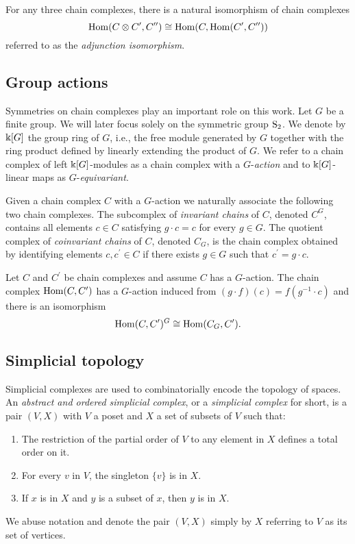 For any three chain complexes, there is a natural isomorphism of chain complexes
\begin{equation*}
\Hom(C \otimes C^\prime, C^{\prime\prime}) \cong
\Hom(C, \Hom(C^\prime, C^{\prime\prime}))
\end{equation*}
referred to as the \textit{adjunction isomorphism}.


\subsection{Group actions}

Symmetries on chain complexes play an important role on this work.
Let $G$ be a finite group.
We will later focus solely on the symmetric group $\S_2$.
We denote by $\k[G]$ the group ring of $G$, i.e., the free module generated by $G$ together with the ring product defined by linearly extending the product of $G$.
We refer to a chain complex of left $\k[G]$-modules as a chain complex with a $G$-\textit{action} and to $\k[G]$-linear maps as $G$-\textit{equivariant}.

Given a chain complex $C$ with a $G$-action we naturally associate the following two chain complexes.
The subcomplex of \textit{invariant chains} of $C$, denoted $C^G$, contains all elements $c \in C$ satisfying $g \cdot c = c$ for every $g \in G$.
The quotient complex of \textit{coinvariant chains} of $C$, denoted $C_G$, is the chain complex obtained by identifying elements $c, c^\prime \in C$ if there exists $g \in G$ such that $c^\prime = g \cdot c$.

Let $C$ and $C^\prime$ be chain complexes and assume $C$ has a $G$-action.
The chain complex $\Hom(C, C^\prime)$ has a $G$-action induced from $(g \cdot f)(c) = f(g^{-1} \cdot c)$ and there is an isomorphism
\begin{equation*}
\Hom(C, C^\prime)^G \cong \Hom(C_G, C^\prime).
\end{equation*}


\subsection{Simplicial topology}

Simplicial complexes are used to combinatorially encode the topology of spaces.
An \textit{abstract and ordered simplicial complex}, or a \textit{simplicial complex} for short, is a pair $(V, X)$ with $V$ a poset and $X$ a set of subsets of $V$ such that: 
\begin{enumerate}
	\item The restriction of the partial order of $V$ to any element in $X$ defines a total order on it.
	\item For every $v$ in $V$, the singleton $\{v\}$ is in $X$.
	\item If $x$ is in $X$ and $y$ is a subset of $x$, then $y$ is in $X$.
\end{enumerate}
We abuse notation and denote the pair $(V, X)$ simply by $X$ referring to $V$ as its set of vertices.

